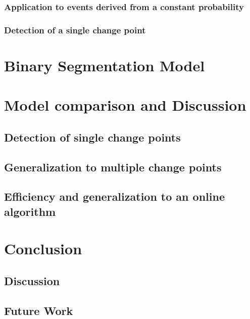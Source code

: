 \documentclass{kththesis}
\begin{document}
\subsection{Application to events derived from a constant probability}

\subsection{Detection of a single change point}



\chapter{Binary Segmentation Model}



\chapter{Model comparison and Discussion}
\label{chap: discussion}

\section{Detection of single change points}

\section{Generalization to multiple change points}

\section{Efficiency and generalization to an online algorithm}


\chapter{Conclusion}

\section{Discussion}

\section{Future Work}

\printbibliography[heading=bibintoc]
\end{document}
